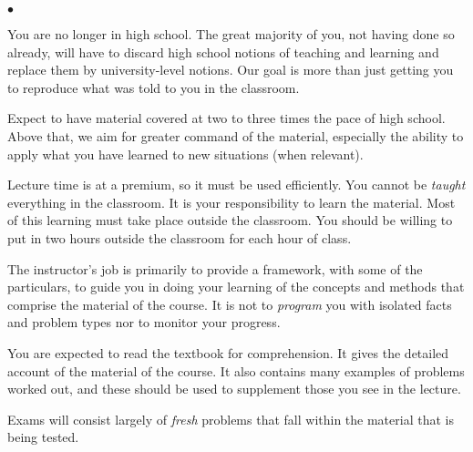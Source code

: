 \documentclass[10pt]{article}
\begin{document}
\begin{list}
{$\bullet$}
{\setlength{\itemsep}{-3pt}}

\item You are no longer in high school. The great majority of you, not having done so already, will have to discard high school notions of teaching and learning and replace them by university-level notions.  Our goal is more than just getting you to reproduce what was told to you in the classroom.

\item Expect to have material covered at two to three times the pace of high school. Above that, we aim for greater command of the material, especially the ability to apply what you have learned to new situations (when relevant).

\item Lecture time is at a premium, so it must be used efficiently. You cannot be \textit{taught} everything in the classroom. It is your responsibility to learn the material. Most of this learning must take place outside the classroom. You should be willing to put in two hours outside the classroom for each hour of class.

\item The instructor's job is primarily to provide a framework, with some of the particulars, to guide you in doing your learning of the concepts and methods that comprise the material of the course. It is not to \textit{program} you with isolated facts and problem types nor to monitor your progress.

\item You are expected to read the textbook for comprehension. It gives the detailed account of the material of the course. It also contains many examples of problems worked out, and these should be used to supplement those you see in the lecture. 


\item Exams will consist largely of \textit{fresh} problems that fall within the material that is being tested.

\end{list}

\newpage




\end{document}
